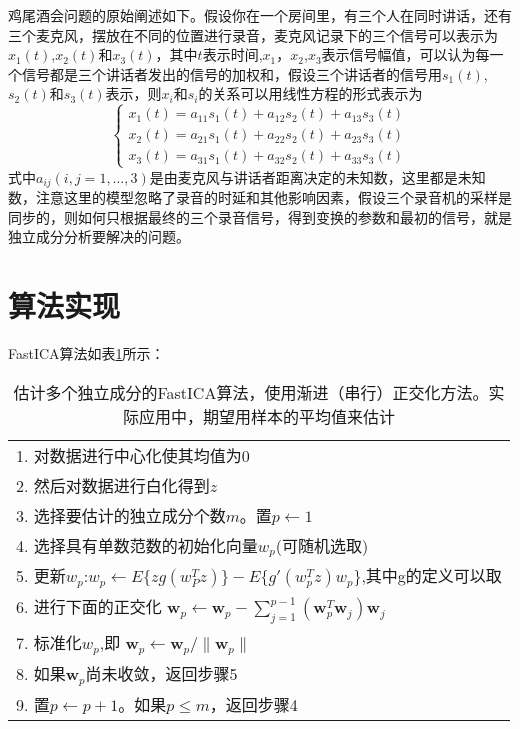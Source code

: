\documentclass[UTF8,zihao=5,a4paper]{ctexart}
\begin{document}
鸡尾酒会问题的原始阐述如下。假设你在一个房间里，有三个人在同时讲话，还有三个麦克风，摆放在不同的位置进行录音，麦克风记录下的三个信号可以表示为$x_1(t)$,$x_2(t)$和$x_3(t)$，其中$t$表示时间,$x_1$，$x_2$,$x_3$表示信号幅值，可以认为每一个信号都是三个讲话者发出的信号的加权和，假设三个讲话者的信号用$s_1(t)$,$s_2(t)$和$s_3(t)$表示，则$x_i$和$s_i$的关系可以用线性方程的形式表示为
\begin{equation}
    \left\{
        \begin{aligned}
            x_1(t)=a_{11}s_1(t)+a_{12}s_2(t)+a_{13}s_3(t) \\
            x_2(t)=a_{21}s_1(t)+a_{22}s_2(t)+a_{23}s_3(t) \\
            x_3(t)=a_{31}s_1(t)+a_{32}s_2(t)+a_{33}s_3(t)
        \end{aligned}
    \right.
\end{equation}
式中$a_{ij}(i,j=1,\ldots,3)$是由麦克风与讲话者距离决定的未知数，这里都是未知数，注意这里的模型忽略了录音的时延和其他影响因素，假设三个录音机的采样是同步的，则如何只根据最终的三个录音信号，得到变换的参数和最初的信号，就是独立成分分析要解决的问题。







\section{算法实现}

FastICA算法如表\ref{fast_ica_alg}所示：

\begin{table}[h]
    \centering
    \begin{tabular}{l}
        \hline 
        1. 对数据进行中心化使其均值为0\\
        2. 然后对数据进行白化得到$z$\\
        3. 选择要估计的独立成分个数$m$。置$p\leftarrow 1$\\
        4. 选择具有单数范数的初始化向量$w_p$(可随机选取)\\
        5. 更新$w_p$:$w_p\leftarrow E\{zg(w_P^T z)\}-E\{g'(w_p^T z)w_p\}$,其中g的定义可以取\\
        6. 进行下面的正交化
        $\mathbf{w}_p\leftarrow \mathbf{w}_p-\sum_{j=1}^{p-1}(\mathbf{w}_p^T \mathbf{w}_j)\mathbf{w}_j$ \\
        7. 标准化$w_p$,即 $\mathbf{w}_p\leftarrow \mathbf{w}_p/\lVert \mathbf{w}_p \rVert$\\
        8. 如果$\mathbf{w}_p$尚未收敛，返回步骤5\\
        9. 置$p\leftarrow p+1$。如果$p\leq m$，返回步骤4\\
        \hline 
    \end{tabular} 
    \caption{估计多个独立成分的FastICA算法，使用渐进（串行）正交化方法。实际应用中，期望用样本的平均值来估计}
    \label{fast_ica_alg}
\end{table}
\end{document}

